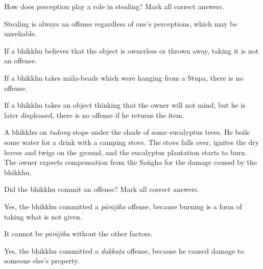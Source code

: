 \begin{exam}{\autoExamName}
\begin{problem}
\end{problem}

\problemDivide

\begin{problem}

  How does perception play a role in stealing? Mark all correct answers.

\bigskip

\begin{manswers}{1}
    \bChoices

     Stealing is always an offense regardless of one's perceptions, which may be unreliable. \eAns

     If a bhikkhu believes that the object is ownerless or thrown away, taking it is not an offense. \eAns

     If a bhikkhu takes māla-beads which were hanging from a Stupa, there is no offense. \eAns

     If a bhikkhu takes an object thinking that the owner will not mind, but he is later displeased, there is no offense if he returns the item. \eAns

    \eChoices
\end{manswers}

\end{problem}

\problemDivide

\begin{problem}

  A bhikkhu on \emph{tudong} stops under the shade of some eucalyptus trees.
  He boils some water for a drink with a camping stove.
  The stove falls over, ignites the dry leaves and twigs on the ground, and the eucalyptus plantation starts to burn.
  The owner expects compensation from the Saṅgha for the damage caused by the bhikkhu.

  Did the bhikkhu commit an offense? Mark all correct answers.

  \bigskip

  \begin{manswers}{1}
    \bChoices
     Yes, the bhikkhu committed a \emph{pārājika} offense, because burning is a form of taking what is not given. \eAns

    \begin{solution}
      It cannot be \emph{pārājika} without the other factors.
    \end{solution}

     Yes, the bhikkhu committed a \emph{dukkaṭa} offense, because he caused damage to someone else's property. \eAns


\end{manswers}
\end{problem}
\end{exam}
